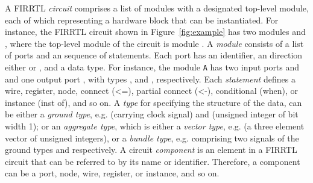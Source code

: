 A FIRRTL \emph{circuit} comprises a list of modules with a designated top-level module, each of which representing a hardware block that can
be instantiated. For instance, the FIRRTL circuit shown in Figure~\ref{fig:example} has two modules  and , where the top-level module of the circuit is module .
A \emph{module} consists of a list of ports and an sequence of statements.
Each port has an identifier,  an direction either  or , and a data type.
For instance, the module {\tt A} has two input ports  and  and one output port , with
types ,  and  , respectively.
Each \emph{statement} defines a wire, register, node, connect (<=), partial connect (<-), conditional (when), or instance (inst of), and so on.
A \emph{type} for specifying the structure of the data, can be either a \emph{ground type}, e.g.   (carrying clock signal) and  (unsigned integer of bit width 1);
or an \emph{aggregate type}, which is either a \emph{vector type}, e.g.   (a three element vector of unsigned integers),
or a \emph{bundle type}, e.g.   comprising two signals of the ground types   and   respectively. A circuit \emph{component} is an element in a FIRRTL circuit that can be referred to by its name or identifier. Therefore, a component can be a port, node, wire, register, or instance, and so on. 


